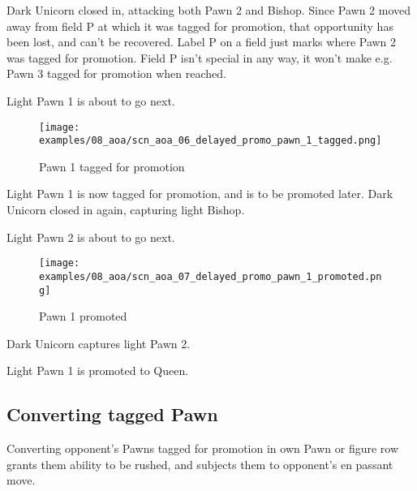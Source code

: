 Dark Unicorn closed in, attacking both Pawn 2 and Bishop. Since Pawn 2 moved
away from field P at which it was tagged for promotion, that opportunity has
been lost, and can't be recovered. Label P on a field just marks where Pawn 2
was tagged for promotion. Field P isn't special in any way, it won't make e.g.
Pawn 3 tagged for promotion when reached.

Light Pawn 1 is about to go next.

\clearpage %

\noindent
\begin{figure}[h]
\texttt{[image: examples/08\_aoa/scn\_aoa\_06\_delayed\_promo\_pawn\_1\_tagged.png]}
\caption{Pawn 1 tagged for promotion}
\label{fig:scn_aoa_06_delayed_promo_pawn_1_tagged}
\end{figure}

Light Pawn 1 is now tagged for promotion, and is to be promoted later.
Dark Unicorn closed in again, capturing light Bishop.

Light Pawn 2 is about to go next.

\clearpage %

\noindent
\begin{figure}[h]
\texttt{[image: examples/08\_aoa/scn\_aoa\_07\_delayed\_promo\_pawn\_1\_promoted.png]}
\caption{Pawn 1 promoted}
\label{fig:scn_aoa_07_delayed_promo_pawn_1_promoted}
\end{figure}

Dark Unicorn captures light Pawn 2.

Light Pawn 1 is promoted to Queen.

\clearpage %

\subsection*{Converting tagged Pawn}

Converting opponent's Pawns tagged for promotion in own Pawn or figure row
grants them ability to be rushed, and subjects them to opponent's en passant
move.


